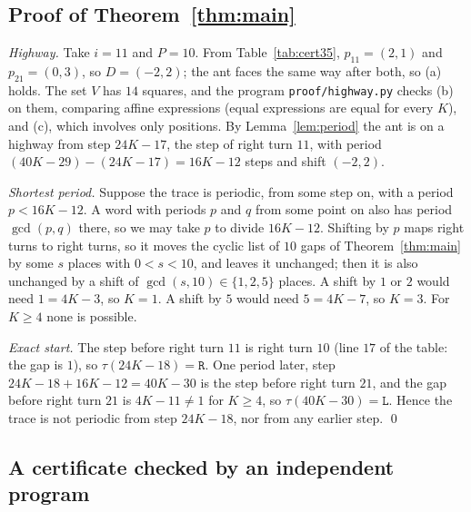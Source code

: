 \documentclass[11pt,a4paper]{article}
\theoremstyle{definition}
\theoremstyle{remark}
\newcommand{\Lw}{\mathtt{L}}
\newcommand{\Rw}{\mathtt{R}}
\begin{document}
\subsection{Proof of Theorem~\ref{thm:main}}

\emph{Highway.} Take $i = 11$ and $P = 10$. From Table~\ref{tab:cert35}, $p_{11} = (2,1)$ and $p_{21} = (0,3)$,
so $D = (-2, 2)$; the ant faces the same way after both, so (a) holds. The set $V$ has $14$ squares, and the
program \texttt{proof/highway.py} checks (b) on them, comparing affine expressions (equal expressions are equal
for every $K$), and (c), which involves only positions. By Lemma~\ref{lem:period} the ant is on a highway from
step $24K - 17$, the step of right turn $11$, with period $(40K - 29) - (24K - 17) = 16K - 12$ steps and shift
$(-2,2)$.

\emph{Shortest period.} Suppose the trace is periodic, from some step on, with a period $p < 16K - 12$. A word
with periods $p$ and $q$ from some point on also has period $\gcd(p, q)$ there, so we may take $p$ to divide
$16K - 12$. Shifting by $p$ maps right turns to right turns, so it moves the cyclic list of $10$ gaps of
Theorem~\ref{thm:main} by some $s$ places with $0 < s < 10$, and leaves it unchanged; then it is also unchanged
by a shift of $\gcd(s, 10) \in \{1, 2, 5\}$ places. A shift by $1$ or $2$ would need $1 = 4K - 3$, so $K = 1$. A
shift by $5$ would need $5 = 4K - 7$, so $K = 3$. For $K \ge 4$ none is possible.

\emph{Exact start.} The step before right turn $11$ is right turn $10$ (line $17$ of the table: the gap is $1$),
so $\tau(24K - 18) = \Rw$. One period later, step $24K - 18 + 16K - 12 = 40K - 30$ is the step before right
turn $21$, and the gap before right turn $21$ is $4K - 11 \ne 1$ for $K \ge 4$, so $\tau(40K - 30) = \Lw$. Hence
the trace is not periodic from step $24K - 18$, nor from any earlier step. \qed

\subsection{A certificate checked by an independent program}\label{sec:cert}
\end{document}
